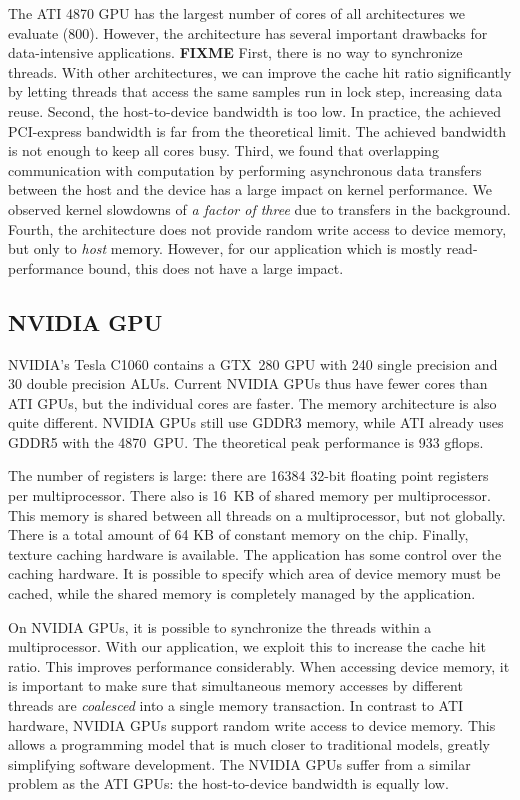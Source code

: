 \documentclass{article}
\begin{document}
The ATI 4870 GPU has the largest number of cores of all architectures
we evaluate (800).  However, the architecture has several important
drawbacks for data-intensive applications.  \textbf{FIXME} First, there is no way to
synchronize threads. With other architectures, we can improve the
cache hit ratio significantly by letting threads that access the same
samples run in lock step, increasing data reuse.  Second, the
host-to-device bandwidth is too low. In practice, the achieved
PCI-express bandwidth is far from the theoretical limit. The achieved
bandwidth is not enough to keep all cores busy.  Third, we found that
overlapping communication with computation by performing asynchronous
data transfers between the host and the device has a large impact on
kernel performance. We observed kernel slowdowns of \emph{a factor of
three} due to transfers in the background.  Fourth, the architecture
does not provide random write access to device memory, but only to
\emph{host} memory. However, for our application which is mostly
read-performance bound, this does not have a large impact.


\subsection{NVIDIA GPU}

NVIDIA's Tesla C1060 contains a GTX~280 GPU with 240 single precision
and 30 double precision ALUs.  Current NVIDIA GPUs thus have fewer
cores than ATI GPUs, but the individual cores are faster. The memory
architecture is also quite different. NVIDIA GPUs still use GDDR3
memory, while ATI already uses GDDR5 with the 4870~GPU.  The
theoretical peak performance is 933 gflops.

The number of registers is large: there are 16384 32-bit floating
point registers per multiprocessor. There also is 16~KB of shared
memory per multiprocessor.  This memory is shared between all threads
on a multiprocessor, but not globally.  There is a total amount of 64
KB of constant memory on the chip.  Finally, texture caching hardware
is available.  The application has some control over the caching
hardware.  It is possible to specify which area of device memory must
be cached, while the shared memory is completely managed by the
application.

On NVIDIA GPUs, it is possible to synchronize the threads within a
multiprocessor.  With our application, we exploit this to increase the
cache hit ratio. This improves performance considerably.  When
accessing device memory, it is important to make sure that
simultaneous memory accesses by different threads are \emph{coalesced}
into a single memory transaction.  In contrast to ATI hardware, NVIDIA
GPUs support random write access to device memory. This allows a
programming model that is much closer to traditional models, greatly
simplifying software development.  The NVIDIA GPUs suffer from a
similar problem as the ATI GPUs: the host-to-device bandwidth is
equally low.
\end{document}
